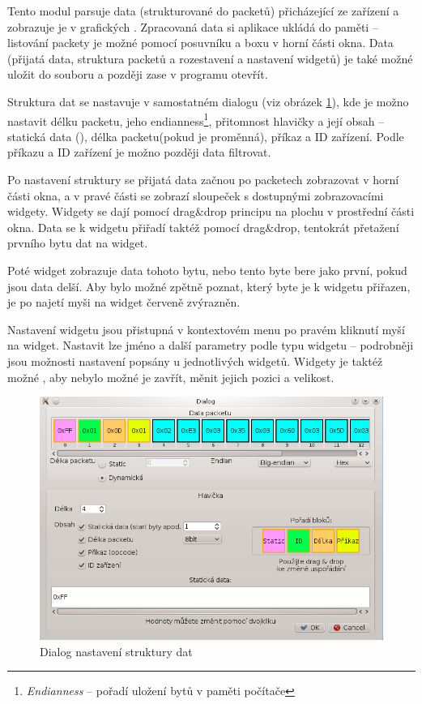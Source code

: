\documentclass[12pt, a4paper, oneside]{article}
\newcommand{\It}{\textit}  %
\begin{document}
Tento modul parsuje data (strukturované do packetů) přicházející ze zařízení a zobrazuje je v grafických . Zpracovaná data si aplikace ukládá do paměti -- listování packety je možné pomocí posuvníku a boxu v horní části okna. Data (přijatá data, struktura packetů a rozestavení a nastavení widgetů) je také možné uložit do souboru a později zase v programu otevřít.  

Struktura dat se nastavuje v samostatném dialogu (viz obrázek \ref{Analyzer_struct}), kde je možno nastavit délku packetu, jeho endianness\footnote{\It{Endianness} -- pořadí uložení bytů v paměti počítače}, přitomnost hlavičky a její obsah -- statická data (), délka packetu(pokud je proměnná), příkaz a ID zařízení. Podle příkazu a ID zařízení je možno později data filtrovat.


\newpage
\setlength{\voffset}{0mm} %
\pagestyle{plain}

Po nastavení struktury se přijatá data začnou po packetech zobrazovat v horní části okna, a v pravé části se zobrazí sloupeček s dostupnými zobrazovacími widgety. Widgety se dají pomocí drag\&drop principu  na plochu v prostřední části okna. Data se k widgetu přiřadí taktéž pomocí drag\&drop, tentokrát přetažení prvního bytu dat na widget. 

Poté widget zobrazuje data tohoto bytu, nebo tento byte bere jako první, pokud jsou data delší. Aby bylo možné zpětně poznat, který byte je k widgetu přiřazen, je po najetí myši na widget červeně zvýrazněn.

Nastavení widgetu jsou přistupná v kontextovém menu po pravém kliknutí myší na widget. Nastavit lze jméno a další parametry podle typu widgetu -- podrobněji jsou možnosti nastavení popsány u jednotlivých widgetů. Widgety je taktéž možné , aby nebylo možné je zavřít, měnit jejich pozici a velikost.

\begin{figure}[h]
\begin{center}
\includegraphics[scale=0.7]{img/analyzer_struct.png}
\caption{Dialog nastavení struktury dat}
\label{Analyzer_struct}
\end{center}
\end{figure}
\end{document}
